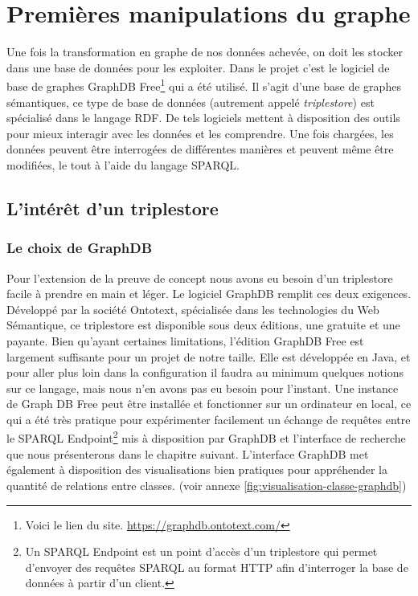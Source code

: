 \chapter{Premières manipulations du graphe}
Une fois la transformation en graphe de nos données achevée, on doit les stocker dans une base de données pour les exploiter. Dans le projet c'est le logiciel de base de graphes GraphDB Free\footnote{Voici le lien du site. \href{https://graphdb.ontotext.com/}{https://graphdb.ontotext.com/}} qui a été utilisé. Il s'agit d'une base de graphes sémantiques, ce type de base de données (autrement appelé \textit{triplestore}) est spécialisé dans le langage RDF. De tels logiciels mettent à disposition des outils pour mieux interagir avec les données et les comprendre. Une fois chargées, les données peuvent être interrogées de différentes manières et peuvent même être modifiées, le tout à l'aide du langage SPARQL.
\section{L'intérêt d'un triplestore}
\subsection{Le choix de GraphDB}
Pour l'extension de la preuve de concept nous avons eu besoin d'un triplestore facile à prendre en main et léger. Le logiciel GraphDB remplit ces deux exigences. Développé par la société Ontotext, spécialisée dans les technologies du Web Sémantique, ce triplestore est disponible sous deux éditions, une gratuite et une payante. Bien qu'ayant certaines limitations, l'édition GraphDB Free est largement suffisante pour un projet de notre taille. Elle est développée en Java, et pour aller plus loin dans la configuration il faudra au minimum quelques notions sur ce langage, mais nous n'en avons pas eu besoin pour l'instant. Une instance de Graph DB Free peut être installée et fonctionner sur un ordinateur en local, ce qui a été très pratique pour expérimenter facilement un échange de requêtes entre le SPARQL Endpoint\footnote{Un SPARQL Endpoint est un point d'accès d'un triplestore qui permet d'envoyer des requêtes SPARQL au format HTTP afin d'interroger la base de données à partir d'un client.} mis à disposition par GraphDB et l'interface de recherche que nous présenterons dans le chapitre suivant. L'interface GraphDB met également à disposition des visualisations bien pratiques pour appréhender la quantité de relations entre classes. (voir annexe \ref{fig:visualisation-classe-graphdb}\label{chapitre6})
